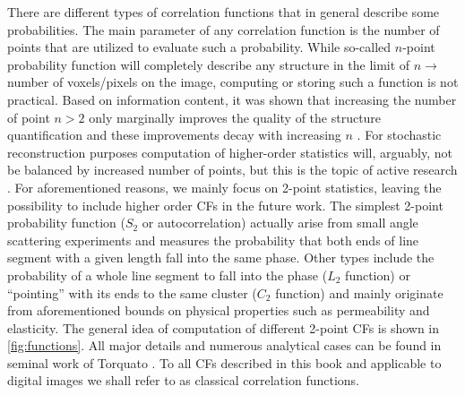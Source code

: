 \documentclass[1p]{elsarticle}
\begin{document}
There are different types of correlation functions that in general describe some
probabilities. The main parameter of any correlation function is the number of
points that are utilized to evaluate such a probability. While so-called
$n$-point probability function \cite{Torquato_book} will completely describe any
structure in the limit of $n \rightarrow$ number of voxels/pixels on the image,
computing or storing such a function is not practical. Based on information
content, it was shown that increasing the number of point $n > 2$ only
marginally improves the quality of the structure quantification and these
improvements decay with increasing $n$ \cite{yao1993high,Gommes2}. For
stochastic reconstruction purposes computation of higher-order statistics will,
arguably, not be balanced by increased number of points, but this is the topic
of active research \cite{skolnick2021,cherkasovIC}. For aforementioned reasons,
we mainly focus on 2-point statistics, leaving the possibility to include higher
order CFs in the future work. The simplest 2-point probability function ($S_2$
or autocorrelation) actually arise from small angle scattering experiments and
measures the probability that both ends of line segment with a given length fall
into the same phase. Other types include the probability of a whole line segment
to fall into the phase ($L_2$ function) or ``pointing'' with its ends to the
same cluster ($C_2$ function) and mainly originate from aforementioned bounds on
physical properties such as permeability and elasticity. The general idea of
computation of different 2-point CFs is shown in \cref{fig:functions}. All major
details and numerous analytical cases can be found in seminal work of Torquato
\cite{Torquato_book}. To all CFs described in this book and applicable to
digital images we shall refer to as classical correlation functions.
\end{document}
